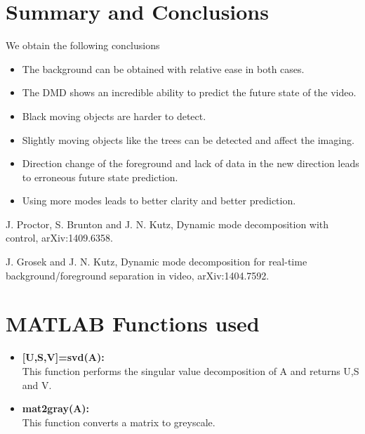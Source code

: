 \documentclass[a4paper]{article}
\begin{document}
\section{Summary and Conclusions}

We obtain the following conclusions
\begin{itemize}
\item The background can be obtained with relative ease in both cases.
\item The DMD shows an incredible ability to predict the future state of the video.
\item Black moving objects are harder to detect.
\item Slightly moving objects like the trees can be detected and affect the imaging.
\item Direction change of the foreground and lack of data in the new direction leads to erroneous future state prediction.
\item Using more modes leads to better clarity and better prediction. 
\end{itemize}

\begin{thebibliography}{1}
	J. Proctor, S. Brunton and J. N. Kutz, Dynamic mode decomposition with control, arXiv:1409.6358.
	
	J. Grosek and J. N. Kutz, Dynamic mode decomposition for real-time background/foreground separation in video, arXiv:1404.7592.
	
	

\end{thebibliography}

\newpage

\appendix


\section{MATLAB Functions used}
\begin{itemize}
\item \textbf{[U,S,V]=svd(A): } \\ This function performs the singular value decomposition of A and returns U,S and V.
\item \textbf{mat2gray(A): } \\ This function converts a matrix to greyscale.

\end{itemize}
\end{document}
